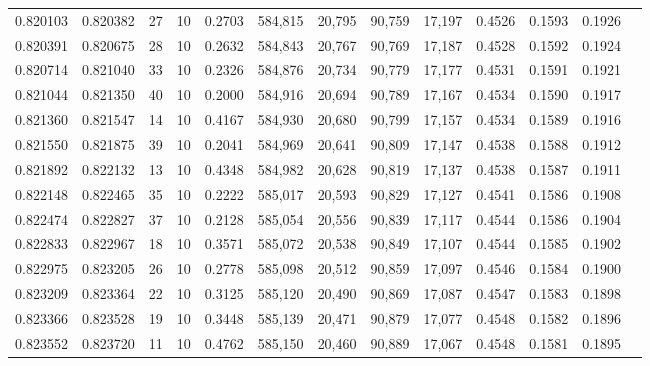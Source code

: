 \begin{tabular}{rrrrrrrrrrrrr}
0.820103 & 0.820382 &    27 &  10 &                                     0.2703 & 584,815 &  20,795 &  90,759 &  17,197 & 0.4526 & 0.1593 & 0.1926 \\
0.820391 & 0.820675 &    28 &  10 &                                     0.2632 & 584,843 &  20,767 &  90,769 &  17,187 & 0.4528 & 0.1592 & 0.1924 \\
0.820714 & 0.821040 &    33 &  10 &                                     0.2326 & 584,876 &  20,734 &  90,779 &  17,177 & 0.4531 & 0.1591 & 0.1921 \\
0.821044 & 0.821350 &    40 &  10 &                                     0.2000 & 584,916 &  20,694 &  90,789 &  17,167 & 0.4534 & 0.1590 & 0.1917 \\
0.821360 & 0.821547 &    14 &  10 &                                     0.4167 & 584,930 &  20,680 &  90,799 &  17,157 & 0.4534 & 0.1589 & 0.1916 \\
0.821550 & 0.821875 &    39 &  10 &                                     0.2041 & 584,969 &  20,641 &  90,809 &  17,147 & 0.4538 & 0.1588 & 0.1912 \\
0.821892 & 0.822132 &    13 &  10 &                                     0.4348 & 584,982 &  20,628 &  90,819 &  17,137 & 0.4538 & 0.1587 & 0.1911 \\
0.822148 & 0.822465 &    35 &  10 &                                     0.2222 & 585,017 &  20,593 &  90,829 &  17,127 & 0.4541 & 0.1586 & 0.1908 \\
0.822474 & 0.822827 &    37 &  10 &                                     0.2128 & 585,054 &  20,556 &  90,839 &  17,117 & 0.4544 & 0.1586 & 0.1904 \\
0.822833 & 0.822967 &    18 &  10 &                                     0.3571 & 585,072 &  20,538 &  90,849 &  17,107 & 0.4544 & 0.1585 & 0.1902 \\
0.822975 & 0.823205 &    26 &  10 &                                     0.2778 & 585,098 &  20,512 &  90,859 &  17,097 & 0.4546 & 0.1584 & 0.1900 \\
0.823209 & 0.823364 &    22 &  10 &                                     0.3125 & 585,120 &  20,490 &  90,869 &  17,087 & 0.4547 & 0.1583 & 0.1898 \\
0.823366 & 0.823528 &    19 &  10 &                                     0.3448 & 585,139 &  20,471 &  90,879 &  17,077 & 0.4548 & 0.1582 & 0.1896 \\
0.823552 & 0.823720 &    11 &  10 &                                     0.4762 & 585,150 &  20,460 &  90,889 &  17,067 & 0.4548 & 0.1581 & 0.1895 \\

\end{tabular}
